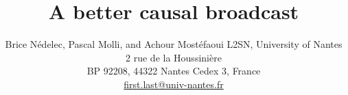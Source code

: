 \documentclass{class-for-drafts}
\begin{document}
\title{A better causal broadcast}

\newcommand{\affLSNN}{L2SN, University of Nantes\\
  2 rue de la Houssini{\`e}re\\
  BP 92208, 44322 Nantes Cedex 3, France\\
  \url{first.last@univ-nantes.fr}}

\author{Brice N{\'e}delec, Pascal Molli, and Achour Most{\'e}faoui \aff \affLSNN}

\proceedings{}


\maketitle








% 


  
\end{document}
